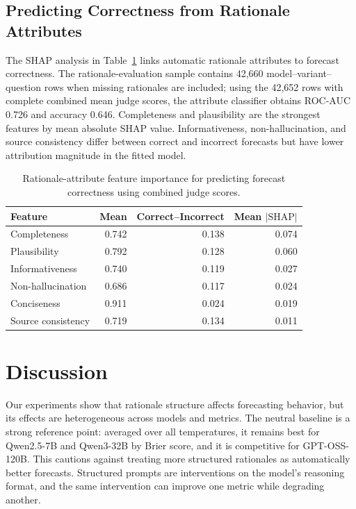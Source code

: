 \documentclass[11pt]{article}
\begin{document}
\subsection{Predicting Correctness from Rationale Attributes}

The SHAP analysis in Table~\ref{tab:shap} links automatic rationale attributes to forecast correctness.
The rationale-evaluation sample contains 42,660 model--variant--question rows when missing rationales are included; using the 42,652 rows with complete combined mean judge scores, the attribute classifier obtains ROC-AUC 0.726 and accuracy 0.646.
Completeness and plausibility are the strongest features by mean absolute SHAP value.
Informativeness, non-hallucination, and source consistency differ between correct and incorrect forecasts but have lower attribution magnitude in the fitted model.

\begin{table}[t]
\centering
\small
\begin{tabular}{lrrr}
\toprule
Feature & Mean & Correct--Incorrect & Mean $|\mathrm{SHAP}|$ \\
\midrule
Completeness & 0.742 & 0.138 & 0.074 \\
Plausibility & 0.792 & 0.128 & 0.060 \\
Informativeness & 0.740 & 0.119 & 0.027 \\
Non-hallucination & 0.686 & 0.117 & 0.024 \\
Conciseness & 0.911 & 0.024 & 0.019 \\
Source consistency & 0.719 & 0.134 & 0.011 \\
\bottomrule
\end{tabular}
\caption{Rationale-attribute feature importance for predicting forecast correctness using combined judge scores.}
\label{tab:shap}
\end{table}

\section{Discussion}

Our experiments show that rationale structure affects forecasting behavior, but its effects are heterogeneous across models and metrics.
The neutral baseline is a strong reference point: averaged over all temperatures, it remains best for Qwen2.5-7B and Qwen3-32B by Brier score, and it is competitive for GPT-OSS-120B.
This cautions against treating more structured rationales as automatically better forecasts.
Structured prompts are interventions on the model's reasoning format, and the same intervention can improve one metric while degrading another.
\end{document}
